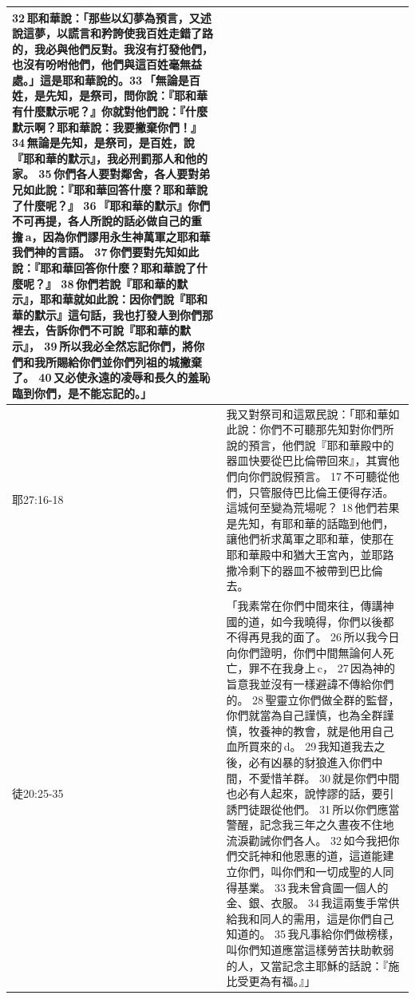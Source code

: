 \begin{table}[H]
\begin{tabular}{p{}|p{}}
32 耶和華說：「那些以幻夢為預言，又述說這夢，以謊言和矜誇使我百姓走錯了路的，我必與他們反對。我沒有打發他們，也沒有吩咐他們，他們與這百姓毫無益處。」這是耶和華說的。33 「無論是百姓，是先知，是祭司，問你說：『耶和華有什麼默示呢？』你就對他們說：『什麼默示啊？耶和華說：我要撇棄你們！』 34 無論是先知，是祭司，是百姓，說『耶和華的默示』，我必刑罰那人和他的家。 35 你們各人要對鄰舍，各人要對弟兄如此說：『耶和華回答什麼？耶和華說了什麼呢？』 36 『耶和華的默示』你們不可再提，各人所說的話必做自己的重擔 a，因為你們謬用永生神萬軍之耶和華我們神的言語。 37 你們要對先知如此說：『耶和華回答你什麼？耶和華說了什麼呢？』 38 你們若說『耶和華的默示』，耶和華就如此說：因你們說『耶和華的默示』這句話，我也打發人到你們那裡去，告訴你們不可說『耶和華的默示』， 39 所以我必全然忘記你們，將你們和我所賜給你們並你們列祖的城撇棄了。 40 又必使永遠的凌辱和長久的羞恥臨到你們，是不能忘記的。」\\\hline  

耶27:16-18&我又對祭司和這眾民說：「耶和華如此說：你們不可聽那先知對你們所說的預言，他們說『耶和華殿中的器皿快要從巴比倫帶回來』，其實他們向你們說假預言。 17 不可聽從他們，只管服侍巴比倫王便得存活。這城何至變為荒場呢？ 18 他們若果是先知，有耶和華的話臨到他們，讓他們祈求萬軍之耶和華，使那在耶和華殿中和猶大王宮內，並耶路撒冷剩下的器皿不被帶到巴比倫去。\\\hline  

徒20:25-35&「我素常在你們中間來往，傳講神國的道，如今我曉得，你們以後都不得再見我的面了。 26 所以我今日向你們證明，你們中間無論何人死亡，罪不在我身上 c， 27 因為神的旨意我並沒有一樣避諱不傳給你們的。 28 聖靈立你們做全群的監督，你們就當為自己謹慎，也為全群謹慎，牧養神的教會，就是他用自己血所買來的 d。 29 我知道我去之後，必有凶暴的豺狼進入你們中間，不愛惜羊群。 30 就是你們中間也必有人起來，說悖謬的話，要引誘門徒跟從他們。 31 所以你們應當警醒，記念我三年之久晝夜不住地流淚勸誡你們各人。 32 如今我把你們交託神和他恩惠的道，這道能建立你們，叫你們和一切成聖的人同得基業。 33 我未曾貪圖一個人的金、銀、衣服。 34 我這兩隻手常供給我和同人的需用，這是你們自己知道的。 35 我凡事給你們做榜樣，叫你們知道應當這樣勞苦扶助軟弱的人，又當記念主耶穌的話說：『施比受更為有福。』」\\\hline  
 \end{tabular}
\end{table}

